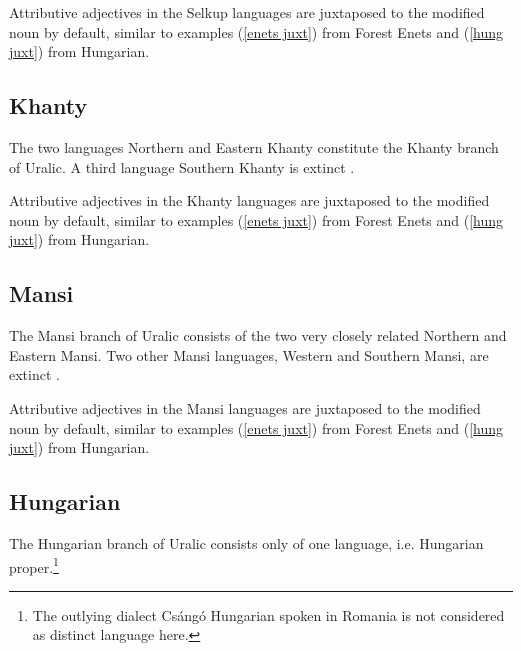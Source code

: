 \noindent Attributive adjectives in the Selkup languages are juxtaposed to the modified noun by default, similar to examples (\ref{enets juxt}) from Forest Enets and (\ref{hung juxt}) from Hungarian.

\subsection{Khanty}
The two languages Northern and Eastern Khanty constitute the Khanty branch of Uralic. A third language Southern Khanty is extinct \citep[231]{salminen2007}.

\noindent Attributive adjectives in the Khanty languages are juxtaposed to the modified noun by default, similar to examples (\ref{enets juxt}) from Forest Enets and (\ref{hung juxt}) from Hungarian.

\subsection{Mansi}
The Mansi branch of Uralic consists of the two very closely related Northern and Eastern Mansi. Two other Mansi languages, Western and Southern Mansi, are extinct \citep[231]{salminen2007}.

\noindent Attributive adjectives in the Mansi languages are juxtaposed to the modified noun by default, similar to examples (\ref{enets juxt}) from Forest Enets and (\ref{hung juxt}) from Hungarian.

\subsection{Hungarian}
The Hungarian branch of Uralic consists only of one language, i.e. Hungarian proper.\footnote{The outlying dialect Csángó Hungarian spoken in Romania is not considered as distinct language here.}

